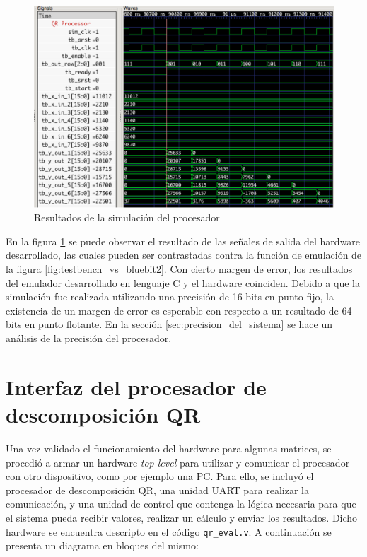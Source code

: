 \begin{figure}[!h]
 	\begin{center}
 		\includegraphics[width=\textwidth]{./figures/C05-sample_qr_processor_wave}
 		\caption{Resultados de la simulación del procesador}
		\label{fig:sample_qr_processor_wave}
 	\end{center}
\end{figure}

En la figura \ref{fig:sample_qr_processor_wave} se puede observar el resultado de las señales de salida del hardware desarrollado, las cuales pueden ser contrastadas contra la función de emulación de la figura \ref{fig:testbench_vs_bluebit2}. Con cierto margen de error, los resultados del emulador desarrollado en lenguaje C y el hardware coinciden. Debido a que la simulación fue realizada utilizando una precisión de 16 bits en punto fijo, la existencia de un margen de error es esperable con respecto a un resultado de 64 bits en punto flotante. En la sección \ref{sec:precision_del_sistema} se hace un análisis de la precisión del procesador.

\section{Interfaz del procesador de descomposición QR}

Una vez validado el funcionamiento del hardware para algunas matrices, se procedió a armar un hardware \textit{top level} para utilizar y comunicar el procesador con otro dispositivo, como por ejemplo una PC. Para ello, se incluyó el procesador de descomposición QR, una unidad UART para realizar la comunicación, y una unidad de control que contenga la lógica necesaria para que el sistema pueda recibir valores, realizar un cálculo y enviar los resultados. Dicho hardware se encuentra descripto en el código \verb;qr_eval.v;. A continuación se presenta un diagrama en bloques del mismo:

